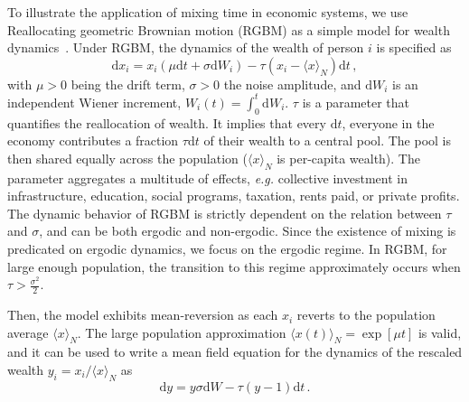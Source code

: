\documentclass[11pt]{article}
\newcommand{\blue}[1]{{\color{blue} #1}}
\newcommand{\eg}{{\it e.g.}\xspace}
\newcommand{\YB}[1]{\blue{{\it YB: #1 YB}}}
\newcommand{\be}{\begin{equation}}
\newcommand{\ee}{\end{equation}}
\numberwithin{equation}{section}
\begin{document}
To illustrate the application of mixing time in economic systems, we use Reallocating geometric Brownian motion (RGBM) as a simple model for wealth dynamics~\citep{BermanPetersAdamou2019}.
Under RGBM, the dynamics of the wealth of person $i$ is specified as
%
\be
    \mathrm{d} x_i = x_i \left( \mu \mathrm{d}t + \sigma \mathrm{d}W_i \right) - \tau \left( x_i - \langle x \rangle_N \right) \mathrm{d}t\,,
\label{eq:rgbm}
\ee
%
with $\mu > 0$ being the drift term, $\sigma > 0$ the noise amplitude, and $\mathrm{d}W_i$ is an independent Wiener increment, $W_i(t) =\int_0^t \mathrm{d}W_i$. $\tau$ is a parameter that quantifies the reallocation of wealth. It implies that every $\mathrm{d}t$, everyone in the economy contributes a fraction $\tau\mathrm{d}t$ of their wealth to a central pool. The pool is then shared equally across the population ($\langle x \rangle_N$ is per-capita wealth). The parameter aggregates a multitude of effects, \eg collective investment in infrastructure, education, social programs, taxation, rents paid, or private profits.
The dynamic behavior of RGBM is strictly dependent on the relation between $\tau$ and $\sigma$, and can be both ergodic and non-ergodic. Since the existence of mixing is predicated on ergodic dynamics, we focus on the ergodic regime. In RGBM, for large enough population, the transition to this regime approximately occurs when $\tau > \frac{\sigma^2}{2}$.


Then, the model exhibits mean-reversion as each $x_i$ reverts to the population average $\langle x \rangle_N$. The large population approximation $\langle x(t) \rangle_N = \exp \left[\mu t\right]$ is valid, and it can be used to write a mean field equation for the dynamics of the rescaled wealth $y_i = x_i / \langle x \rangle_N$ as
%
\be
    \mathrm{d} y =   y \sigma  \mathrm{d} W - \tau (y - 1)  \mathrm{d}t\,.
    \label{eq:rescaled-rgbm}
\ee
%
\end{document}
